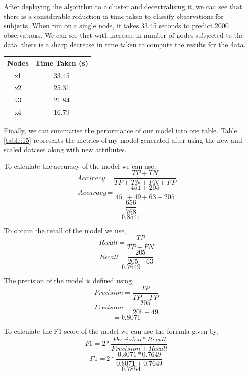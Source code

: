 \documentclass[12pt]{article}
\begin{document}
After deploying the algorithm to a cluster and decentralising it, we can see that there is a considerable reduction in time taken to classify observations for subjects. When run on a single node, it takes 33.45 seconds to predict 2000 observations. We can see that with increase in number of nodes subjected to the data, there is a sharp decrease in time taken to compute the results for the data.

\begin{table}[ht]
\centering
\begin{tabular}{|c|c|}
\hline
Nodes & Time Taken (s) \\\hline
x1    & 33.45          \\\hline
x2    & 25.31          \\\hline
x3    & 21.84          \\\hline
x4    & 16.79          \\\hline
\end{tabular}
\label{table:13}
\end{table}

Finally, we can summarise the performance of our model into one table. Table \ref{table:15} represents the metrics of my model generated after using the new and scaled dataset along with new attributes.

To calculate the accuracy of the model we can use,
\begin{equation}
Accuracy = \dfrac{TP+TN}{TP+TN+FN+FP}
\end{equation}
$$Accuracy = \dfrac{451+205}{451+49+63+205}$$
$$=\dfrac{656}{768}$$
$$=0.8541$$

To obtain the recall of the model we use,
\begin{equation}
Recall = \dfrac{TP}{TP+FN}
\end{equation}
$$Recall = \dfrac{205}{205+63}$$
$$ = 0.7649$$

The precision of the model is defined using,
\begin{equation}
Precision = \dfrac{TP}{TP+FP}
\end{equation}
$$Precision = \dfrac{205}{205+49}$$
$$=0.8071$$

To calculate the F1 score of the model we can use the formula given by,
\begin{equation}
F1 = 2*\dfrac{Precision*Recall}{Precision+Recall}
\end{equation}
$$F1=2*\dfrac{0.8071*0.7649}{0.8071+0.7649}$$
$$=0.7854$$
\end{document}
